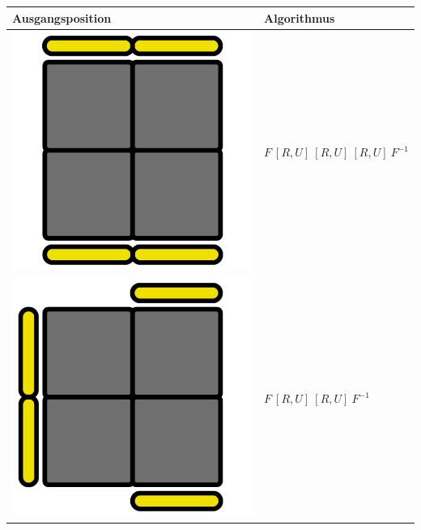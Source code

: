 \documentclass[12pt,a4paper, usenames, dvipsnames]{article}
\theoremstyle{mystyle}
\theoremstyle{definition}
\begin{document}
\begin{center}
\begin{tabular}{m{4cm} m{6cm}}
\toprule
Ausgangsposition & Algorithmus  \\
\midrule
\includegraphics[scale=0.08]{TOPVIEW1.png} & $F \ [ R,U ] \  [ R,U ] \  [ R,U ] \ F^{-1}$ \\
\includegraphics[scale=0.08]{TOPVIEW2.png} & $F \ [ R,U ] \  [ R,U ] \ F^{-1}$ \\

\end{tabular}
\end{center}
\end{document}

